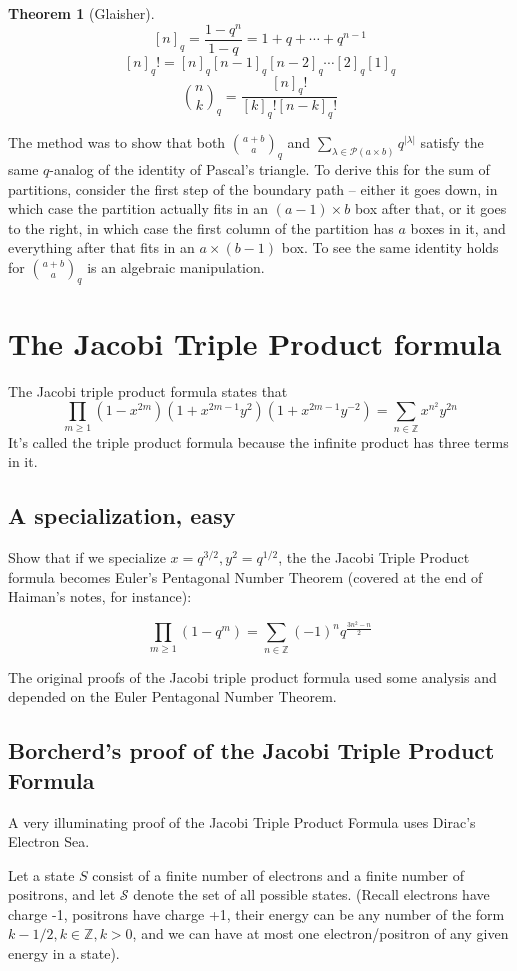 \documentclass{article}
\theoremstyle{definition}
\newcommand{\Z}{\mathbb{Z}}
\newtheorem{theorem}[dummy]{Theorem}
\begin{document}
\begin{theorem}[Glaisher]
$$[n]_q=\frac{1-q^n}{1-q}=1+q+\cdots+q^{n-1}$$
$$[n]_q!=[n]_q[n-1]_q[n-2]_q\cdots [2]_q[1]_q$$
$$\binom{n}{k}_q=\frac{[n]_q!}{[k]_q![n-k]_q!}$$

The method was to show that both $\binom{a+b}{a}_q$ and $\sum_{\lambda\in\mathcal{P}(a\times b)} q^{|\lambda|}$ satisfy the same $q$-analog of the identity of Pascal's triangle.  To derive this for the sum of partitions, consider the first step of the boundary path -- either it goes down, in which case the partition actually fits in an $(a-1)\times b$ box after that, or it goes to the right, in which case the first column of the partition has $a$ boxes in it, and everything after that fits in an $a\times (b-1)$ box.  To see the same identity holds for $\binom{a+b}{a}_q$ is an algebraic manipulation.


\section{The Jacobi Triple Product formula}
The Jacobi triple product formula states that
$$\prod_{m\geq 1} (1-x^{2m})(1+x^{2m-1}y^2)(1+x^{2m-1}y^{-2})=\sum_{n\in\mathbb{Z}}x^{n^2}y^{2n}$$
It's called the triple product formula because the infinite product has three terms in it.

\subsection{A specialization, easy}
Show that if we specialize $x=q^{3/2}, y^2=q^{1/2}$, the the Jacobi Triple Product formula becomes Euler's Pentagonal Number Theorem (covered at the end of Haiman's notes, for instance):

$$\prod_{m\geq 1} (1-q^m)=\sum_{n\in\Z}(-1)^n q^{\frac{3n^2-n}{2}}$$

The original proofs of the Jacobi triple product formula used some analysis and depended on the Euler Pentagonal Number Theorem.
\subsection{Borcherd's proof of the Jacobi Triple Product Formula}
A very illuminating proof of the Jacobi Triple Product Formula uses Dirac's Electron Sea.

Let a state $S$ consist of a finite number of electrons and a finite number of positrons, and let $\mathcal{S}$ denote the set of all possible states.  (Recall electrons have charge -1, positrons have charge +1, their energy can be any number of the form $k-1/2, k\in\Z, k>0$, and we can have at most one electron/positron of any given energy in a state).  


\end{theorem}
\end{document}
